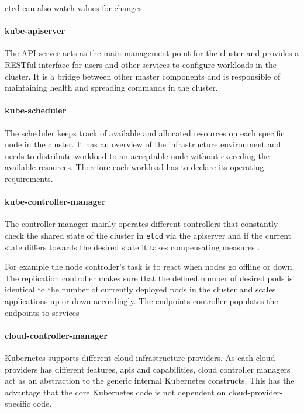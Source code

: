 etcd can also watch values for changes \cite{baier-kub}.

\paragraph{kube-apiserver}\label{kube-apiserver}

The API server acts as the main management point for the cluster and
provides a RESTful interface for users and other services to configure
workloads in the cluster. It is a bridge between other master components
and is responsible of maintaining health and spreading commands in the
cluster. \cite{kub_intro}

\paragraph{kube-scheduler}\label{kube-scheduler}

The scheduler keeps track of available and allocated resources on each
specific node in the cluster. It has an overview of the infrastructure
environment and needs to distribute workload to an acceptable node
without exceeding the available resources. Therefore each workload has
to declare its operating requirements. \cite{kub_intro}

\paragraph{kube-controller-manager}\label{kube-controller-manager}

The controller manager mainly operates different controllers that
constantly check the shared state of the cluster in \texttt{etcd} via
the apiserver \cite{kub_comp} and if the current state differs towards
the desired state it takes compensating measures \cite{kub_intro}.

For example the node controller's task is to react when nodes go offline
or down. The replication controller makes sure that the defined number
of desired pods is identical to the number of currently deployed pods in
the cluster and scales applications up or down accordingly. The
endpoints controller populates the endpoints to services \cite{kub_comp}

\paragraph{cloud-controller-manager}\label{cloud-controller-manager}

Kubernetes supports different cloud infrastructure providers. As each
cloud providers has different features, apis and capabilities, cloud
controller managers act as an abstraction to the generic internal
Kubernetes constructs. This has the advantage that the core Kubernetes
code is not dependent on cloud-provider-specific code. \cite{kub_comp}


